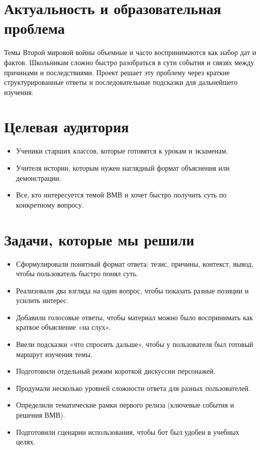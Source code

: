 \documentclass[a4paper,14pt]{extarticle}
\begin{document}
    \section{Актуальность и образовательная проблема}
    Темы Второй мировой войны объемные и часто воспринимаются как набор дат и фактов. Школьникам сложно быстро разобраться в сути события и связях между причинами и последствиями. Проект решает эту проблему через краткие структурированные ответы и последовательные подсказки для дальнейшего изучения.

    \section{Целевая аудитория}
    \begin{itemize}
        \item Ученики старших классов, которые готовятся к урокам и экзаменам.
        \item Учителя истории, которым нужен наглядный формат объяснения или демонстрации.
        \item Все, кто интересуется темой ВМВ и хочет быстро получить суть по конкретному вопросу.
    \end{itemize}

    \section{Задачи, которые мы решили}
    \begin{itemize}
        \item Сформулировали понятный формат ответа: тезис, причины, контекст, вывод, чтобы пользователь быстро понял суть.
        \item Реализовали два взгляда на один вопрос, чтобы показать разные позиции и усилить интерес.
        \item Добавили голосовые ответы, чтобы материал можно было воспринимать как краткое объяснение «на слух».
        \item Ввели подсказки «что спросить дальше», чтобы у пользователя был готовый маршрут изучения темы.
        \item Подготовили отдельный режим короткой дискуссии персонажей.
        \item Продумали несколько уровней сложности ответа для разных пользователей.
        \item Определили тематические рамки первого релиза (ключевые события и решения ВМВ).
        \item Подготовили сценарии использования, чтобы бот был удобен в учебных целях.
    \end{itemize}
\end{document}
